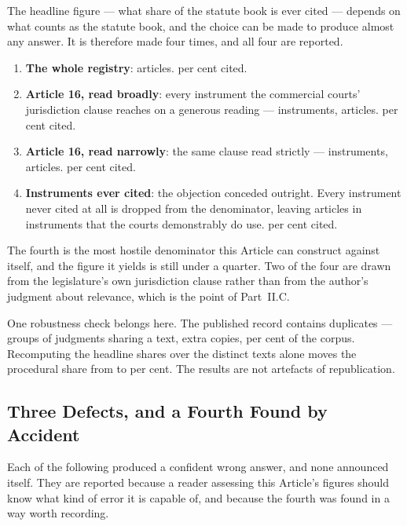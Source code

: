 \documentclass[12pt]{article}
\begin{document}
The headline figure --- what share of the statute book is ever cited ---
depends on what counts as the statute book, and the choice can be made to
produce almost any answer. It is therefore made four times, and all four are
reported.

\begin{enumerate}
\singlespacing
\item \textbf{The whole registry}: \nRegistryArticles{} articles.
\nArticlesCitedShare{} per cent cited.
\item \textbf{Article 16, read broadly}: every instrument the commercial
courts' jurisdiction clause reaches on a generous reading ---
\nScopeBroadInstruments{} instruments, \nScopeBroadArticles{} articles.
\nScopeBroadShare{} per cent cited.
\item \textbf{Article 16, read narrowly}: the same clause read strictly ---
\nScopeNarrowInstruments{} instruments, \nScopeNarrowArticles{} articles.
\nScopeNarrowShare{} per cent cited.
\item \textbf{Instruments ever cited}: the objection conceded outright. Every
instrument never cited at all is dropped from the denominator, leaving
\nAppliedOnlyArticles{} articles in \nAppliedOnlyInstruments{} instruments
that the courts demonstrably do use. \nAppliedOnlyShare{} per cent cited.
\end{enumerate}

The fourth is the most hostile denominator this Article can construct against
itself, and the figure it yields is still under a quarter. Two of the four are
drawn from the legislature's own jurisdiction clause rather than from the
author's judgment about relevance, which is the point of Part~II.C.

One robustness check belongs here. The published record contains duplicates
--- \nDuplicateGroups{} groups of judgments sharing a text, \nDuplicateExtra{}
extra copies, \nDuplicateShare{} per cent of the corpus. Recomputing the
headline shares over the \nDistinctTexts{} distinct texts alone moves the
procedural share from \nProceduralShare{} to \nDedupProcedural{} per cent. The
results are not artefacts of republication.

\subsection{Three Defects, and a Fourth Found by Accident}
\label{sub:defects}

Each of the following produced a confident wrong answer, and none announced
itself. They are reported because a reader assessing this Article's figures
should know what kind of error it is capable of, and because the fourth was
found in a way worth recording.
\end{document}
